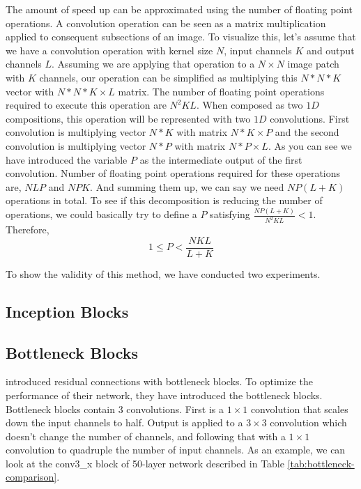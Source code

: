 The amount of speed up can be approximated using the number of floating point operations. A convolution operation can be seen as a matrix multiplication applied to consequent subsections of an image. To visualize this, let's assume that we have a convolution operation with kernel size $N$, input channels $K$ and output channels $L$. Assuming we are applying that operation to a $N \times N$ image patch with $K$ channels, our operation can be simplified as multiplying this $N*N*K$ vector with $N*N*K \times L$ matrix. The number of floating point operations required to execute this operation are $N^2KL$. When composed as two $1D$ compositions, this operation will be represented with two $1D$ convolutions. First convolution is multiplying vector $N*K$ with matrix $N*K \times P$ and the second convolution is multiplying vector $N*P$ with matrix $N*P \times L$. As you can see we have introduced the variable $P$ as the intermediate output of the first convolution. Number of floating point operations required for these operations are, $NLP$ and $NPK$. And summing them up, we can say we need $NP(L + K)$ operations in total. To see if this decomposition is reducing the number of operations, we could basically try to define a $P$ satisfying $\frac{NP(L+K)}{N^2KL} < 1$. Therefore,
\begin{equation*}
1 \leq P < \frac{NKL}{L+K}
\end{equation*}


To show the validity of this method, we have conducted two experiments. 

\subsection{Inception Blocks}
\subsection{Bottleneck Blocks}
\cite{He:2015aa} introduced residual connections with bottleneck blocks. To optimize the performance of their network, they have introduced the bottleneck blocks. Bottleneck blocks contain 3 convolutions. First is a $ 1 \times 1$ convolution that scales down the input channels to half. Output is applied to a $3 \times 3$ convolution which doesn't change the number of channels, and following that with a $1 \times 1$ convolution to quadruple the number of input channels. As an example, we can look at the conv3\_x block of 50-layer network described in Table \ref{tab:bottleneck-comparison}.

